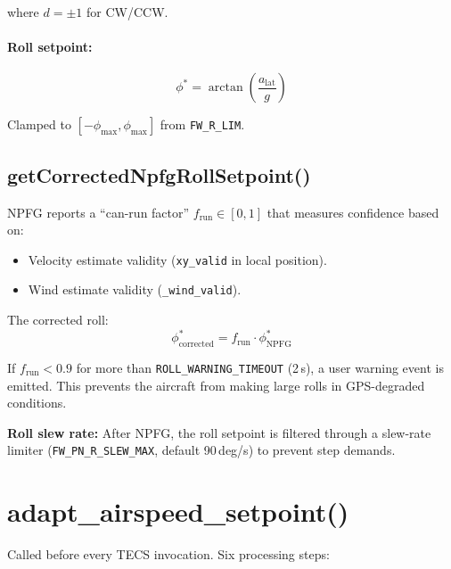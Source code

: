 \documentclass[12pt,a4paper]{article}
\begin{document}
where $d = \pm 1$ for CW/CCW.

\paragraph{Roll setpoint:}
\begin{equation}
  \phi^* = \arctan\!\left(\frac{a_{\text{lat}}}{g}\right)
\end{equation}

Clamped to $[-\phi_{\max}, \phi_{\max}]$ from \texttt{FW\_R\_LIM}.

\subsection{getCorrectedNpfgRollSetpoint()}

NPFG reports a ``can-run factor'' $f_{\text{run}} \in [0, 1]$ that
measures confidence based on:
\begin{itemize}
  \item Velocity estimate validity (\texttt{xy\_valid} in local position).
  \item Wind estimate validity (\texttt{\_wind\_valid}).
\end{itemize}

The corrected roll:
\begin{equation}
  \phi^*_{\text{corrected}} = f_{\text{run}} \cdot \phi^*_{\text{NPFG}}
\end{equation}

If $f_{\text{run}} < 0.9$ for more than \texttt{ROLL\_WARNING\_TIMEOUT}
(2\,s), a user warning event is emitted. This prevents the aircraft from
making large rolls in GPS-degraded conditions.

\textbf{Roll slew rate:} After NPFG, the roll setpoint is filtered
through a slew-rate limiter (\texttt{FW\_PN\_R\_SLEW\_MAX}, default
90\,deg/s) to prevent step demands.

\section{adapt\_airspeed\_setpoint()}

Called before every TECS invocation. Six processing steps:
\end{document}
